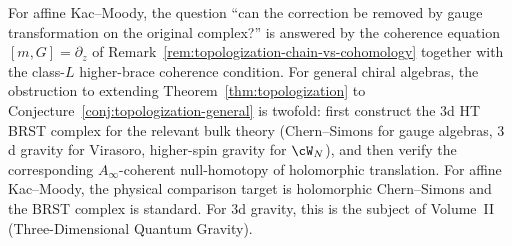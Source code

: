 \begin{remark}
For affine Kac--Moody, the question
``can the correction be removed by gauge transformation on the
original complex?'' is answered by the coherence equation
$[m,G]=\partial_z$ of
Remark~\ref{rem:topologization-chain-vs-cohomology} together
with the class-$L$ higher-brace coherence condition. For general chiral
algebras, the obstruction to extending
Theorem~\ref{thm:topologization} to
Conjecture~\ref{conj:topologization-general} is twofold:
first construct the $3$d HT BRST complex for the relevant
bulk theory (Chern--Simons for gauge algebras, $3$d gravity
for Virasoro, higher-spin gravity for $\cW_N$), and then
verify the corresponding $A_\infty$-coherent null-homotopy of
holomorphic translation.
For affine Kac--Moody, the physical comparison target is holomorphic
Chern--Simons and the BRST complex is standard. For
$3$d gravity, this is the subject of Volume~II
\textup{(}Three-Dimensional Quantum Gravity\textup{)}.
\end{remark}

